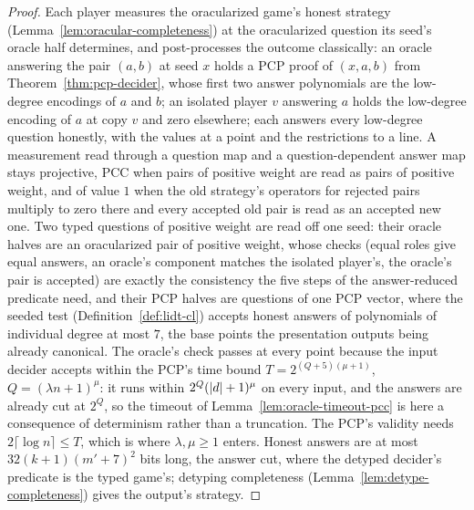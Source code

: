 \begin{proof}
\leanok
Each player measures the oracularized game's honest strategy
(Lemma~\ref{lem:oracular-completeness}) at the oracularized question its seed's oracle half
determines, and post-processes the outcome classically: an oracle answering the pair $(a,b)$ at
seed $x$ holds a PCP proof of $(x,a,b)$ from Theorem~\ref{thm:pcp-decider}, whose first two
answer polynomials are the low-degree encodings of $a$ and $b$; an isolated player $v$ answering
$a$ holds the low-degree encoding of $a$ at copy $v$ and zero elsewhere; each answers every
low-degree question honestly, with the values at a point and the restrictions to a line. A
measurement read through a question map and a question-dependent answer map stays projective,
PCC when pairs of positive weight are read as pairs of positive weight, and of value $1$ when
the old strategy's operators for rejected pairs multiply to zero there and every accepted old
pair is read as an accepted new one. Two typed questions of positive weight are read off one
seed: their oracle halves are an oracularized pair of positive weight, whose checks (equal roles
give equal answers, an oracle's component matches the isolated player's, the oracle's pair is
accepted) are exactly the consistency the five steps of the answer-reduced predicate need, and
their PCP halves are questions of one PCP vector, where the seeded test (Definition~\ref{def:lidt-cl})
accepts honest answers of polynomials of individual degree at most $7$, the base points the
presentation outputs being already canonical. The oracle's check passes at every point because
the input decider accepts within the PCP's time bound $T=2^{(Q+5)(\mu+1)}$, $Q=(\lambda n+1)^\mu$:
it runs within $2^Q(\left\vert {d} \right\vert+1)^\mu$ on every input, and the answers are already cut at $2^Q$, so
the timeout of Lemma~\ref{lem:oracle-timeout-pcc} is here a consequence of determinism rather
than a truncation. The PCP's validity needs $2\lceil\log n\rceil\leq T$, which is where
$\lambda,\mu\geq1$ enters. Honest answers are at most $32(k+1)(m'+7)^2$ bits long, the answer cut,
where the detyped decider's predicate is the typed game's; detyping completeness
(Lemma~\ref{lem:detype-completeness}) gives the output's strategy.
\end{proof}

